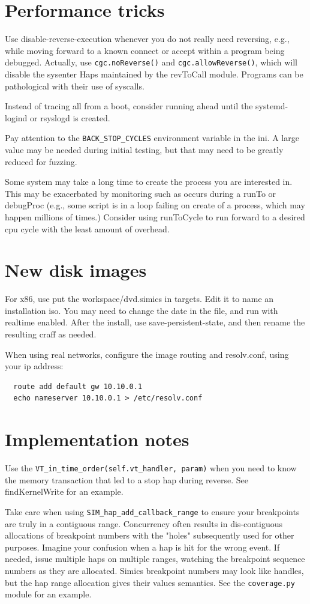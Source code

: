 \documentclass[titlepage]{article}
\begin{document}
\begin{appendices}
\section{Performance tricks}
Use disable-reverse-execution whenever you do not really need reversing, e.g., while moving forward to a known connect or accept
within a program being debugged.  Actually, use {\tt cgc.noReverse()} and {\tt cgc.allowReverse()}, which will disable the sysenter
Haps maintained by the revToCall module.  Programs can be pathological with their use of syscalls.

Instead of tracing all from a boot, consider running ahead until the systemd-logind or rsyslogd is created.

Pay attention to the {\tt BACK\_STOP\_CYCLES} environment variable in the ini.  A large value may be needed during initial testing,
but that may need to be greatly reduced for fuzzing.

Some system may take a long time to create the process you are interested in.  This may be exacerbated by monitoring such as occurs during
a runTo or debugProc (e.g., some script is in a loop failing on create of a process, which may happen millions of times.)  Consider using
runToCycle to run forward to a desired cpu cycle with the least amount of overhead.

\section{New disk images}
For x86, use put the workspace/dvd.simics in targets.  Edit it to name an installation iso.  You may need to change the date in
the file, and run with realtime enabled.  After the install, use save-persistent-state, and then rename the resulting craff as
needed.

When using real networks, configure the image routing and resolv.conf, using your ip address:
\begin{verbatim}
  route add default gw 10.10.0.1
  echo nameserver 10.10.0.1 > /etc/resolv.conf
\end{verbatim}


\section{Implementation notes}
Use the {\tt VT\_in\_time\_order(self.vt\_handler, param)} when you need to know the memory transaction that
led to a stop hap during reverse.  See findKernelWrite for an example.

Take care when using {\tt SIM\_hap\_add\_callback\_range} to ensure your breakpoints are truly in a contiguous range.
Concurrency often results in dis-contiguous allocations of breakpoint numbers with the "holes" subsequently used for other purposes.
Imagine your confusion when a hap is hit for the wrong event.  If needed, issue multiple haps on multiple ranges, watching the
breakpoint sequence numbers as they are allocated.  Simics breakpoint numbers may look like handles, but the hap range allocation 
gives their values semantics.  See the {\tt coverage.py} module for an example.


\end{appendices}
\end{document}
